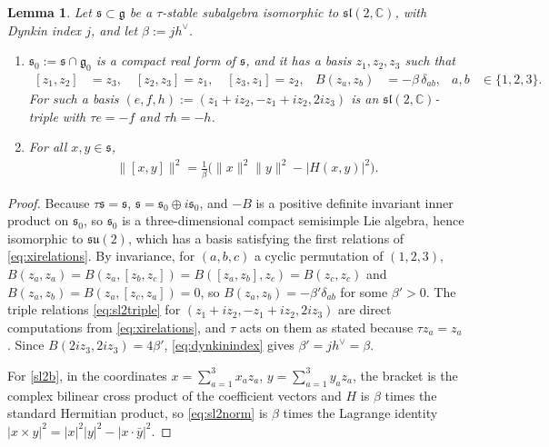 \documentclass [leqno, 10pt]{amsart}
\newtheorem{lemma}[theorem]{Lemma}%
\theoremstyle{definition}
\numberwithin{equation}{section}
\newcommand{\su}{\mathfrak{su}}
\newcommand{\sll}{\mathfrak{sl}}
\newcommand{\g}{\mathfrak{g}}
\newcommand{\com}{\mathbb C}
\newcommand{\gz}{\g_{0}}
\newcommand{\hv}{h^\vee}
\newcommand{\norm}[1]{\lVert #1\rVert}
\newcommand{\subs}{\mathfrak{s}}
\begin{document}
\begin{lemma}\label{lem:sl2str}
Let $\subs\subset\g$ be a $\tau$-stable subalgebra isomorphic to $\sll(2, \com)$, with Dynkin index $j$, and let $\beta := j\hv$.
\begin{enumerate}[label=(\arabic*), ref=(\arabic*)]
\item\label{sl2a} $\subs_0:=\subs\cap\gz$ is a compact real form of $\subs$, and it has a basis $z_1,z_2,z_3$ such that
\begin{align}\label{eq:xirelations}
[z_{1}, z_{2}] &= z_{3}, \quad [z_{2}, z_{3}] = z_{1}, \quad [z_{3}, z_{1}] = z_{2}, & B(z_a,z_b) &= -\beta\,\delta_{ab}, & a, b &\in \{1, 2, 3\}.
\end{align}
For such a basis $(e, f, h) := (z_{1} + iz_{2}, -z_{1} + iz_{2}, 2iz_{3})$ is an $\sll(2, \com)$-triple with $\tau e = -f$ and $\tau h = -h$.
\item\label{sl2b} For all $x, y \in \subs$,
\begin{align}\label{eq:sl2norm}
\norm{[x,y]}^2 = \frac{1}{\beta}\Big(\norm{x}^{2}\norm{y}^{2} - |H(x, y)|^{2}\Big).
\end{align}
\end{enumerate}
\end{lemma}

\begin{proof}
Because $\tau\subs = \subs$, $\subs = \subs_{0} \oplus i\subs_{0}$, and $-B$ is a positive definite invariant inner product on $\subs_{0}$, so $\subs_{0}$ is a three-dimensional compact semisimple Lie algebra, hence isomorphic to $\su(2)$, which has a basis satisfying the first relations of \eqref{eq:xirelations}. By invariance, for $(a, b, c)$ a cyclic permutation of $(1, 2, 3)$, $B(z_{a}, z_{a}) = B(z_{a}, [z_{b}, z_{c}]) = B([z_{a}, z_{b}], z_{c}) = B(z_{c}, z_{c})$ and $B(z_{a}, z_{b}) = B(z_{a}, [z_{c}, z_{a}]) = 0$, so $B(z_{a}, z_{b}) = -\beta'\delta_{ab}$ for some $\beta' > 0$. The triple relations \eqref{eq:sl2triple} for $(z_{1} + iz_{2}, -z_{1} + iz_{2}, 2iz_{3})$ are direct computations from \eqref{eq:xirelations}, and $\tau$ acts on them as stated because $\tau z_{a} = z_{a}$. Since $B(2iz_{3}, 2iz_{3}) = 4\beta'$, \eqref{eq:dynkinindex} gives $\beta' = j\hv = \beta$.

For \ref{sl2b}, in the coordinates $x = \sum_{a=1}^{3}x_{a}z_{a}$, $y = \sum_{a=1}^{3}y_{a}z_{a}$, the bracket is the complex bilinear cross product of the coefficient vectors and $H$ is $\beta$ times the standard Hermitian product, so \eqref{eq:sl2norm} is $\beta$ times the Lagrange identity $|x \times y|^{2} = |x|^{2}|y|^{2} - |x \cdot \bar{y}|^{2}$.
\end{proof}
\end{document}
